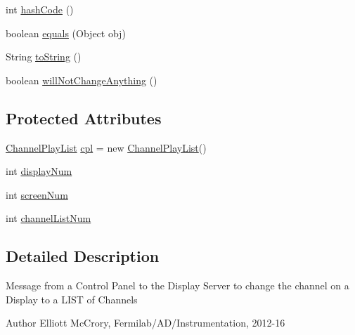 \begin{DoxyCompactItemize}
\item 
int \hyperlink{classgov_1_1fnal_1_1ppd_1_1dd_1_1xml_1_1messages_1_1ChangeChannelList_ab6cd3efb56d89f6d72256f68c9d71466}{hash\-Code} ()
\item 
boolean \hyperlink{classgov_1_1fnal_1_1ppd_1_1dd_1_1xml_1_1messages_1_1ChangeChannelList_aeb76efd0fe4b3860d301167e73a74aee}{equals} (Object obj)
\item 
String \hyperlink{classgov_1_1fnal_1_1ppd_1_1dd_1_1xml_1_1messages_1_1ChangeChannelList_ade9df77cea4be6bdd9a351a22281dcb0}{to\-String} ()
\item 
boolean \hyperlink{classgov_1_1fnal_1_1ppd_1_1dd_1_1xml_1_1messages_1_1ChangeChannelList_a23c8330036ee3c2d699843b770d568a1}{will\-Not\-Change\-Anything} ()
\end{DoxyCompactItemize}
\subsection*{Protected Attributes}
\begin{DoxyCompactItemize}
\item 
\hyperlink{classgov_1_1fnal_1_1ppd_1_1dd_1_1channel_1_1ChannelPlayList}{Channel\-Play\-List} \hyperlink{classgov_1_1fnal_1_1ppd_1_1dd_1_1xml_1_1messages_1_1ChangeChannelList_a80d69dad3db10d90afcb29580f1eb95e}{cpl} = new \hyperlink{classgov_1_1fnal_1_1ppd_1_1dd_1_1channel_1_1ChannelPlayList}{Channel\-Play\-List}()
\item 
int \hyperlink{classgov_1_1fnal_1_1ppd_1_1dd_1_1xml_1_1messages_1_1ChangeChannelList_a0aa72cb7a63f2139bb7e18c9643a9f54}{display\-Num}
\item 
int \hyperlink{classgov_1_1fnal_1_1ppd_1_1dd_1_1xml_1_1messages_1_1ChangeChannelList_a854dc25a06aa4b550596c8bfe3e1d45d}{screen\-Num}
\item 
int \hyperlink{classgov_1_1fnal_1_1ppd_1_1dd_1_1xml_1_1messages_1_1ChangeChannelList_aaaefc4dea4e775fa76f0ff78df36dc4c}{channel\-List\-Num}
\end{DoxyCompactItemize}


\subsection{Detailed Description}
Message from a Control Panel to the Display Server to change the channel on a Display to a L\-I\-S\-T of Channels

\begin{DoxyAuthor}{Author}
Elliott Mc\-Crory, Fermilab/\-A\-D/\-Instrumentation, 2012-\/16 
\end{DoxyAuthor}


